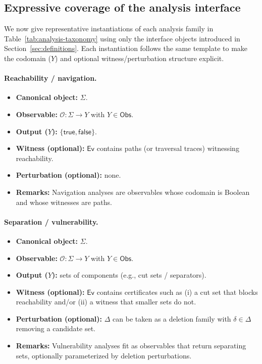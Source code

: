 \documentclass[11pt]{article}
\begin{document}
\subsection{Expressive coverage of the analysis interface}
\label{sec:expressive-coverage}
We now give representative instantiations of each analysis family in Table~\ref{tab:analysis-taxonomy} using only the interface objects introduced in Section~\ref{sec:definitions}. Each instantiation follows the same template to make the codomain ($Y$) and optional witness/perturbation structure explicit.

\paragraph{Reachability / navigation.}
\begin{itemize}[leftmargin=*]
  \item \textbf{Canonical object:} $\Sigma$.
  \item \textbf{Observable:} $\mathcal O: \Sigma\to Y$ with $Y\in\mathsf{Obs}$.
  \item \textbf{Output ($Y$):} $\{\mathsf{true},\mathsf{false}\}$.
  \item \textbf{Witness (optional):} $\mathsf{Ev}$ contains paths (or traversal traces) witnessing reachability.
  \item \textbf{Perturbation (optional):} none.
  \item \textbf{Remarks:} Navigation analyses are observables whose codomain is Boolean and whose witnesses are paths.
\end{itemize}

\paragraph{Separation / vulnerability.}
\begin{itemize}[leftmargin=*]
  \item \textbf{Canonical object:} $\Sigma$.
  \item \textbf{Observable:} $\mathcal O: \Sigma\to Y$ with $Y\in\mathsf{Obs}$.
  \item \textbf{Output ($Y$):} sets of components (e.g., cut sets / separators).
  \item \textbf{Witness (optional):} $\mathsf{Ev}$ contains certificates such as (i) a cut set that blocks reachability and/or (ii) a witness that smaller sets do not.
  \item \textbf{Perturbation (optional):} $\Delta$ can be taken as a deletion family with $\delta\in\Delta$ removing a candidate set.
  \item \textbf{Remarks:} Vulnerability analyses fit as observables that return separating sets, optionally parameterized by deletion perturbations.
\end{itemize}
\end{document}
